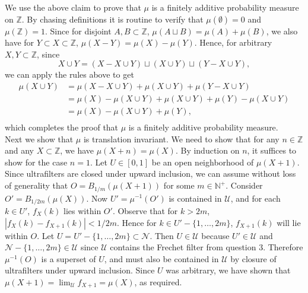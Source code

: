 \documentclass{article}
\begin{document}
\begin{enumerate}
    We use the above claim to prove that $\mu$ is a finitely additive
    probability measure on $\mathbb{Z}$. By chasing definitions it is
    routine to verify that $\mu(\emptyset)=0$ and $\mu(\mathbb{Z})=1$.
    Since for disjoint $A,B\subset\mathbb{Z}$, $\mu(A\sqcup
    B)=\mu(A)+\mu(B)$, we also have for $Y\subset X\subset\mathbb{Z}$,
    $\mu(X-Y)=\mu(X)-\mu(Y)$. Hence, for arbitrary $X,Y\subset\mathbb{Z}$,
    since
    \begin{equation*}
      X\cup Y = (X-X\cup Y)\sqcup(X\cup Y)\sqcup(Y-X\cup Y),
    \end{equation*}
    we can apply the rules above to get
    \begin{align*}
      \mu(X\cup Y) &= \mu(X-X\cup Y)+\mu(X\cup Y)+\mu(Y-X\cup Y) \\
                   &= \mu(X)-\mu(X\cup Y)+\mu(X\cup Y)+\mu(Y)-\mu(X\cup Y) \\
                   &= \mu(X)-\mu(X\cup Y)+\mu(Y), \\
    \end{align*}
    which completes the proof that $\mu$ is a finitely additive probability
    measure. \\

    Next we show that $\mu$ is translation invariant. We need to show that
    for any $n\in\mathbb{Z}$ and any $X\subset\mathbb{Z}$, we have
    $\mu(X+n)=\mu(X)$. By induction on $n$, it suffices to show for the
    case $n=1$. Let $U\in[0,1]$ be an open neighborhood of $\mu(X+1)$.
    Since ultrafilters are closed under upward inclusion, we can assume
    without loss of generality that $O=B_{1/m}(\mu(X+1))$ for some
    $m\in\mathbb{N}^+$. Consider $O'=B_{1/2m}(\mu(X))$. Now
    $U'=\mu^{-1}(O')$ is contained in $\mathcal{U}$, and for each $k\in
    U'$, $f_X(k)$ lies within $O'$. Observe that for $k>2m$,
    $|f_X(k)-f_{X+1}(k)|<1/2m$. Hence for $k\in U'-\{1,\ldots,2m\}$,
    $f_{X+1}(k)$ will lie within $O$. Let
    $U=U'-\{1,\ldots,2m\}\subset\mathcal{N}$. Then $U\in\mathcal{U}$
    because $U'\in\mathcal{U}$ and
    $\mathcal{N}-\{1,\ldots,2m\}\in\mathcal{U}$ since $\mathcal{U}$
    contains the Frechet filter from question 3. Therefore
    $\mu^{-1}(O)$ is a superset of $U$, and must
    also be contained in $\mathcal{U}$ by closure of ultrafilters under
    upward inclusion. Since $U$ was arbitrary, we have shown that
    $\mu(X+1)=\lim_\mathcal{U}f_{X+1}=\mu(X)$, as required.
\end{enumerate}
\end{document}
